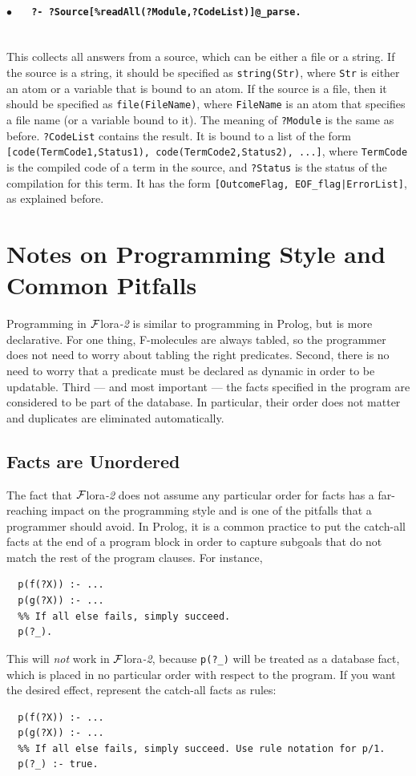 \documentclass[11pt]{article}
\newcommand{\FLORA}{{\mbox{\sc ${\cal F}${lora}\rm\emph{-2}}}\xspace}
\begin{document}
  \paragraph{$\bullet$~~~\tt ?- ?Source[\%readAll(?Module,?CodeList)]@\_parse.}~~\\
  This collects all answers from a source, which can be either a file or a
  string. If the source is a string, it should be
  specified as {\tt string(Str)}, where {\tt Str} is either an atom or a
  variable that is bound to an atom. If the source is a file, then it should
  be specified as {\tt file(FileName)}, where {\tt FileName} is an atom
  that specifies a file name (or a variable bound to it).   The meaning of
  {\tt ?Module} is the same as before. 
  {\tt ?CodeList} contains the result. It is bound to
  a list of the form {\tt [code(TermCode1,Status1), code(TermCode2,Status2),
    ...]}, where  
  {\tt TermCode} is the compiled code of a term in the source, and
  {\tt ?Status}  is the status of the compilation for this term. It has the
  form {\tt [OutcomeFlag, EOF\_flag|ErrorList]}, as explained before.


\section{Notes on Programming Style and Common Pitfalls}

Programming in \FLORA is similar to programming in Prolog, but is more
declarative. For one thing, F-molecules are always tabled, so the
programmer does not need to worry about tabling the right predicates.
Second, there is no need to worry that a predicate must be declared as
dynamic in order to be updatable. Third --- and most important --- the facts 
specified in the program are considered to be part of the database. In
particular, their order does not matter and duplicates are eliminated
automatically. 

\subsection{Facts are Unordered}

The fact that \FLORA does not assume any particular order for facts has a
far-reaching impact on the programming style and is one of the
pitfalls that a programmer should avoid.  In Prolog, it is a
common practice to put the catch-all facts at the end of a program block in
order to capture subgoals that do not match the rest of the program
clauses. For instance,
\begin{verbatim}
  p(f(?X)) :- ...
  p(g(?X)) :- ...
  %% If all else fails, simply succeed.
  p(?_).
\end{verbatim}
This will \emph{not} work in \FLORA, because {\tt p(?\_)} will be treated as a
database fact, which is placed in no particular order with respect to the
program. If you want the desired effect, represent the catch-all facts as
rules: 
\begin{verbatim}
  p(f(?X)) :- ...
  p(g(?X)) :- ...
  %% If all else fails, simply succeed. Use rule notation for p/1.
  p(?_) :- true.
\end{verbatim}
\end{document}
